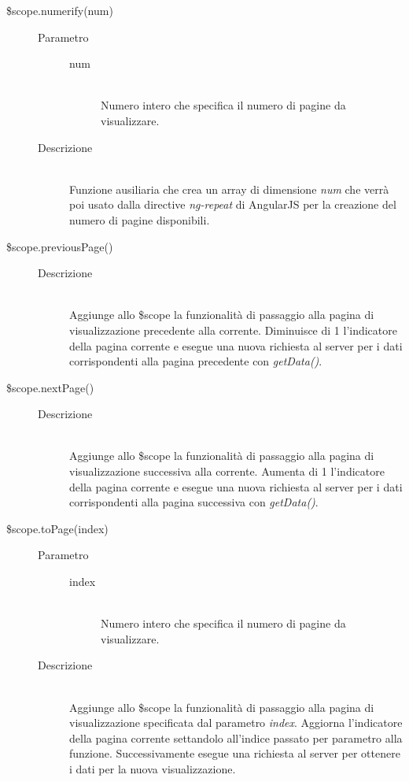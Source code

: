 \begin{description}
\begin{description}
  \item[\$scope.numerify(num)] \hfill 
  \begin{description}
  	\item[Parametro] \hfill
  	\begin{description}
  		\item[num] \hfill \\
  		Numero intero che specifica il numero di pagine da visualizzare.
  	\end{description}
  	\item[Descrizione] \hfill \\
  	Funzione ausiliaria che crea un array di dimensione \textit{num} che verrà poi usato dalla directive \textit{ng-repeat} di AngularJS per la creazione del numero di pagine disponibili.
  \end{description}
  
  \item[\$scope.previousPage()] \hfill 
  \begin{description}
  	\item[Descrizione] \hfill \\
  	Aggiunge allo \$scope la funzionalità di passaggio alla pagina di visualizzazione precedente alla corrente. Diminuisce di 1 l'indicatore della pagina corrente e esegue una nuova richiesta al server per i dati corrispondenti alla pagina precedente con \textit{getData()}.
  \end{description}
  
  \item[\$scope.nextPage()] \hfill
  \begin{description}
  	\item[Descrizione] \hfill \\
  Aggiunge allo \$scope la funzionalità di passaggio alla pagina di visualizzazione successiva alla corrente. Aumenta di 1 l'indicatore della pagina corrente e esegue una nuova richiesta al server per i dati corrispondenti alla pagina successiva con \textit{getData()}.
  \end{description}
  
  \item[\$scope.toPage(index)] \hfill
  \begin{description}
  	\item[Parametro] \hfill
  	\begin{description}
  		\item[index] \hfill \\
  		Numero intero che specifica il numero di pagine da visualizzare.
  	\end{description}
  	\item[Descrizione] \hfill \\
  	Aggiunge allo \$scope la funzionalità di passaggio alla pagina di visualizzazione specificata dal parametro \textit{index}.
  Aggiorna l'indicatore della pagina corrente settandolo all'indice passato per parametro alla funzione.
  Successivamente esegue una richiesta al server per ottenere i dati per la nuova visualizzazione.
  \end{description}
  

\end{description}
\end{description}
